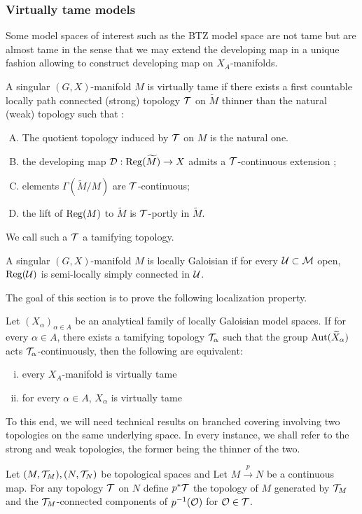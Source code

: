 \subsubsection{Virtually tame models}
Some model spaces of interest such as the BTZ model space are not tame  but are almost tame in the sense that we may extend the developing map in a unique fashion allowing to construct developing map on $X_A$-manifolds. 
\begin{defi}\label{def:singular_manifold_virtually_tame} A singular $(G,X)$-manifold $M$ is virtually tame if there exists  a first countable locally path connected (strong) topology $\mathcal{T}$ on $\widetilde M$ thinner than the natural (weak) topology such that :
\begin{enumerate}[(A)]
\item The quotient topology induced by $\mathcal{T}$ on $M$ is the natural one.
 \item the developing map $\mathcal{D}:\mathrm{Reg}(\widetilde M)\rightarrow X$ admits a $\mathcal{T}$-continuous extension ;
 \item elements $\Gamma(\widetilde M/M)$ are $\mathcal{T}$-continuous;
 \item  the lift of $\mathrm{Reg}(M)$ to $\widetilde M$ is $\mathcal{T}$-portly in $\widetilde M$.
\end{enumerate}
We call such a $\mathcal{T}$ a tamifying topology.
\end{defi}
\begin{defi}\label{def:singular_manifold_locally_galoisian}A singular $(G,X)$-manifold $M$ is locally Galoisian  
if for every $\mathcal{U}\subset \mathcal M$ open, $\mathrm{Reg}(\mathcal{U})$ is semi-locally simply connected in $\mathcal{U}$.
\end{defi}
The goal of this section is to prove the following localization property.

\begin{thm}\label{theo:local_virt_tame} Let $(X_\alpha)_{\alpha\in A}$ be an analytical family of locally Galoisian model spaces.
If for every $\alpha\in A$, there exists a tamifying topology $\mathcal{T}_\alpha$ such that the group $\mathrm{Aut}(\widetilde X_\alpha)$ acts $\mathcal{T}_\alpha$-continuously,
 then the following are equivalent:
\begin{enumerate}[(i)]
 \item every $X_A$-manifold is virtually tame
 \item for every $\alpha \in A$, $X_\alpha$ is virtually tame
\end{enumerate}
\end{thm}

To this end, we will need technical results on branched covering involving two topologies on the same underlying space. In every instance, we shall refer to the strong and weak topologies, the former being the thinner of the two.
\begin{defi}\label{def:topological_spaces_continuous_map} Let $(M,\mathcal{T}_M),(N,\mathcal{T}_N)$ be topological spaces and Let $M\xrightarrow{p} N$ be a continuous map. For any topology $\mathcal{T}$ on $N$ define $p^*\mathcal{T}$ the topology of $M$ generated by $\mathcal{T}_M$ and the $\mathcal{T}_M$-connected components of $p^{-1}(\mathcal{O})$ for $\mathcal{O}\in \mathcal{T}$. 
 
\end{defi}



